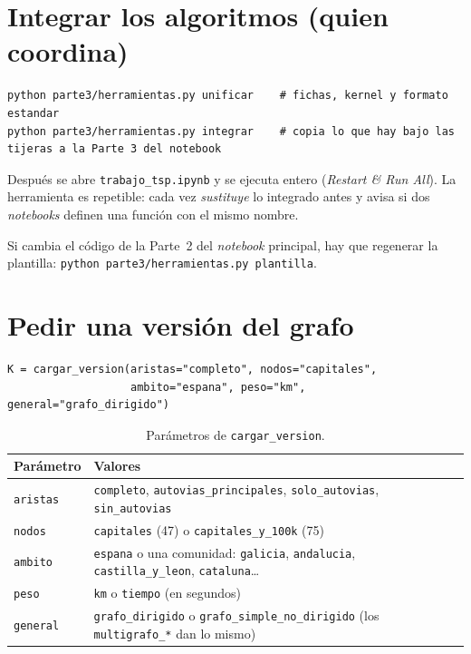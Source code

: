 \documentclass[11pt,a4paper,twoside,openany]{report}
\begin{document}
\section{Integrar los algoritmos (quien coordina)}

\begin{lstlisting}
python parte3/herramientas.py unificar    # fichas, kernel y formato estandar
python parte3/herramientas.py integrar    # copia lo que hay bajo las tijeras a la Parte 3 del notebook
\end{lstlisting}
Después se abre \texttt{trabajo\_tsp.ipynb} y se ejecuta entero (\emph{Restart \& Run All}). La herramienta es repetible: cada vez \emph{sustituye} lo integrado antes y avisa si dos \emph{notebooks} definen una función con el mismo nombre.

Si cambia el código de la Parte~2 del \emph{notebook} principal, hay que regenerar la plantilla: \texttt{python parte3/herramientas.py plantilla}.

\section{Pedir una versión del grafo}

\begin{lstlisting}
K = cargar_version(aristas="completo", nodos="capitales",
                   ambito="espana", peso="km", general="grafo_dirigido")
\end{lstlisting}

\begin{table}[htbp]
  \centering
  \caption{Parámetros de \texttt{cargar\_version}.}
  \small
  \begin{tabularx}{\linewidth}{@{}l X@{}}
    \toprule
    Parámetro & Valores \\
    \midrule
    \texttt{aristas} & \texttt{completo}, \texttt{autovias\_principales}, \texttt{solo\_autovias}, \texttt{sin\_autovias} \\
    \texttt{nodos} & \texttt{capitales} (47) o \texttt{capitales\_y\_100k} (75) \\
    \texttt{ambito} & \texttt{espana} o una comunidad: \texttt{galicia}, \texttt{andalucia}, \texttt{castilla\_y\_leon}, \texttt{cataluna}\dots \\
    \texttt{peso} & \texttt{km} o \texttt{tiempo} (en segundos) \\
    \texttt{general} & \texttt{grafo\_dirigido} o \texttt{grafo\_simple\_no\_dirigido} (los \texttt{multigrafo\_*} dan lo mismo) \\
    \bottomrule
  \end{tabularx}
\end{table}
\end{document}
